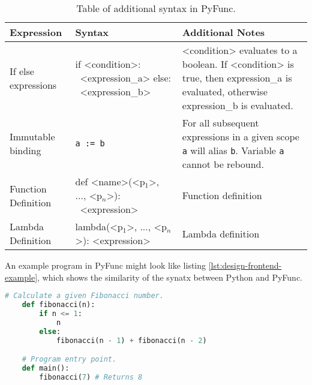 \documentclass{l4proj}
\begin{document}
\begin{table}[!h]
    \caption{Table of additional syntax in PyFunc.}
    \begin{center}

    \begin{tabular}{@{}|l|p{5cm}|p{4cm}|@{}}
        \hline
        \textbf{Expression}  &   \textbf{Syntax}     &   \textbf{Additional Notes}   \\
        \hline
        \hline
        If else expressions & if <condition>: \newline \-\ <expression\_a> \newline else: \newline \-\ <expression\_b> & <condition> evaluates to a boolean. If <condition> is true, then expression\_a is evaluated, otherwise expression\_b is evaluated.\\
        \hline
        Immutable binding   & \texttt{a := b}   & For all subsequent expressions in a given scope \texttt{a} will alias \texttt{b}. Variable \texttt{a} cannot be rebound. \\
        \hline
        Function Definition & def <name>(<p$_1$>, ..., <p$_n$>): \newline \-\ <expression> & Function definition\\
        \hline
        Lambda Definition & lambda(<p$_1$>, ..., <p$_n$>): <expression> & Lambda definition \\
        \hline
        
    \end{tabular}
    \end{center}
\end{table}

An example program in PyFunc might look like listing \ref{lst:design-frontend-example}, which shows the similarity of the synatx between Python and PyFunc.
\begin{lstlisting}[language=python, caption={The simple recursive function to calculate a given fibonacci number.}, label=lst:design-frontend-example]
    # Calculate a given Fibonacci number.
    def fibonacci(n):
        if n <= 1:
            n
        else:
            fibonacci(n - 1) + fibonacci(n - 2)

    # Program entry point.
    def main():
        fibonacci(7) # Returns 8
\end{lstlisting}
\end{document}
